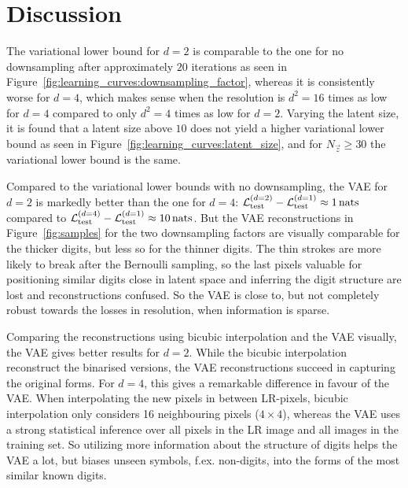 \section{Discussion}
\label{sec:discussion}

The variational lower bound for $d = 2$ is comparable to the one for no downsampling after approximately $20$ iterations as seen in Figure~\ref{fig:learning_curves:downsampling_factor}, whereas it is consistently worse for $d = 4$, which makes sense when the resolution is $d^2 = 16$ times as low for $d = 4$ compared to only $d^2 = 4$ times as low for $d = 2$.
Varying the latent size, it is found that a latent size above $10$ does not yield a higher variational lower bound as seen in Figure~\ref{fig:learning_curves:latent_size}, and for $N_{\vec{z}} \geq 30$ the variational lower bound is the same.

Compared to the variational lower bounds with no downsampling, the VAE for $d = 2$ is markedly better than the one for $d = 4$: $\mathcal{L}_{\text{test}}^{(d = 2)} - \mathcal{L}_{\text{test}}^{(d = 1)} \approx \SI{1}{nats}$ compared to $\mathcal{L}_{\text{test}}^{(d = 4)} - \mathcal{L}_{\text{test}}^{(d = 1)} \approx \SI{10}{nats}$.
But the VAE reconstructions in Figure~\ref{fig:samples} for the two downsampling factors are visually comparable for the thicker digits, but less so for the thinner digits. The thin strokes are more likely to break after the Bernoulli sampling, so the last pixels valuable for positioning similar digits close in latent space and inferring the digit structure are lost and reconstructions confused.  
So the VAE is close to, but not completely robust towards the losses in resolution, when information is sparse. 

Comparing the reconstructions using bicubic interpolation and the VAE visually, the VAE gives better results for $d = 2$.
While the bicubic interpolation reconstruct the binarised versions, the VAE reconstructions succeed in capturing the original forms.
For $d = 4$, this gives a remarkable difference in favour of the VAE.
When interpolating the new pixels in between LR-pixels, bicubic interpolation only considers 16 neighbouring pixels ($4\times 4$), whereas the VAE uses a strong statistical inference over all pixels in the LR image and all images in the training set. So utilizing more information about the structure of digits helps the VAE a lot, but biases unseen symbols, f.ex. non-digits, into the forms of the most similar known digits.    
